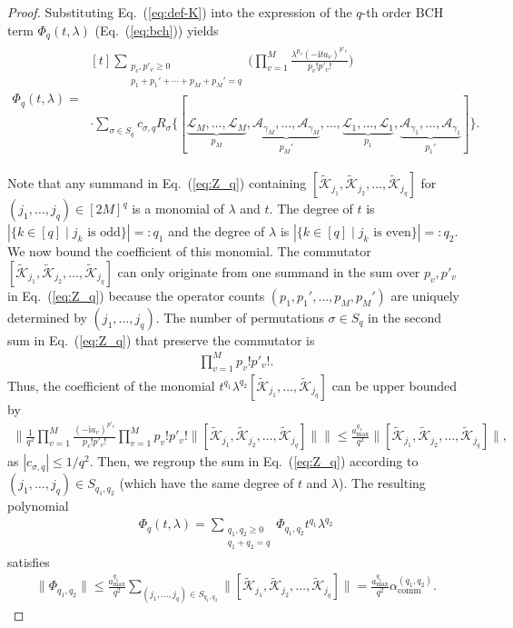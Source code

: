 \documentclass[11pt]{article}
\newcommand{\eq}[1]{(\ref{eq:#1})}
\renewcommand{\i}{\mathrm{i}}
\newcommand{\A}{\mathcal{A}}
\renewcommand{\comm}{\mathrm{comm}}
\newcommand{\mc}{\mathcal}
\begin{document}
\begin{proof}
 	Substituting Eq.~\eq{def-K} into the expression of the $q$-th order BCH term $\Phi_q(t,\lambda)$ (Eq.~\eq{bch}) yields 
 	\begin{align}
 	 	\Phi_q(t,\lambda)
 	 	=~ \begin{multlined}[t]
 	 	 	\sum_{\substack{p_v,p'_v\ge 0\\ p_1+p_1'+\cdots+p_M+p_M'=q }}\bigg(\prod_{v=1}^M \frac{\lambda^{p_v}(-\i ta_v)^{p'_v}}{p_v!p'_v!} \bigg) \\ 
 	 	\cdot \sum_{\sigma\in S_q} c_{\sigma, q}R_{\sigma}\big\{[\underbrace{\mc L_M, \ldots,\mc L_M}_{p_M}, \underbrace{\A_{\gamma_M}, \ldots, \mc A_{\gamma_M}}_{p_M'}, \ldots, \underbrace{ \mc L_1,  \ldots, \mc L_1}_{p_1}, \underbrace{\A_{\gamma_1},  \ldots, \mc A_{\gamma_1}}_{p_1'}]\big\}.\label{eq:Z_q}\end{multlined}
 	\end{align}
 	
 	Note that any summand in Eq.~\eq{Z_q} containing $[\tilde{\mc K}_{j_1}, \tilde{\mc K}_{j_2}, \ldots, \tilde{\mc K}_{j_q}]$ for $(j_1, \ldots, j_q)\in [2M]^q$ is a monomial of $\lambda$ and $t$. The degree of $t$ is $|\{k\in [q]\mid j_k \text{ is odd}\}|=: q_1$ and the degree of $\lambda$ is $|\{k\in [q]\mid j_k \text{ is even}\}|=: q_2$. We now bound the coefficient of this monomial. The commutator $[\tilde{\mc K}_{j_1}, \tilde{\mc K}_{j_2}, \ldots, \tilde{\mc K}_{j_q}]$ can only originate from one summand in the sum over $p_v, p'_v$ in Eq.~\eq{Z_q} because the operator counts $(p_1, p_1', \ldots, p_M, p_M')$ are uniquely determined by $(j_1, \ldots, j_q)$. The number of permutations $\sigma\in S_q$ in the second sum in Eq.~\eq{Z_q} that preserve the commutator is
 	\begin{align*}
 	 	\prod_{v=1}^M p_v!p'_v!.
 	\end{align*}
 	Thus, the coefficient of the monomial $t^{q_1}\lambda^{q_2}[\tilde{\mc K}_{j_1}, \ldots, \tilde{\mc K}_{j_q}]$ can be upper bounded by
 	\begin{align*}
 	 	\bigg\|\frac{1}{q^2}\prod_{v=1}^M \frac{(-\i a_v)^{p'_v}}{p_v!p'_v!}\prod_{v=1}^M p_v!p'_v!\big\|[\tilde{\mc K}_{j_1}, \tilde{\mc K}_{j_2}, \ldots, \tilde{\mc K}_{j_q}]\big\|\bigg\| \le \frac{a_{\max}^{q_1}}{q^2}  \big\|[\tilde{\mc K}_{j_1}, \tilde{\mc K}_{j_2}, \ldots, \tilde{\mc K}_{j_q}]\big\|,
 	\end{align*}
 	as $|c_{\sigma, q}|\le 1/q^2$. Then, we regroup the sum in Eq.~\eq{Z_q} according to $(j_1, \ldots, j_q)\in S_{q_1, q_2}$ (which have the same degree of $t$ and $\lambda$). The resulting polynomial
 	\begin{align*}
 	 	\Phi_q(t,\lambda) = \sum_{\substack{q_1, q_2 \ge 0\\q_1+q_2 = q}}\Phi_{q_1, q_2} t^{q_1}\lambda^{q_2}
 	\end{align*}
 	satisfies
 	\begin{align*}
 	 	\|\Phi_{q_1, q_2}\|\le  \frac{a_{\max}^{q_1}}{q^2}\sum_{(j_1, \ldots, j_q)\in S_{q_1, q_2}} \big\|[\tilde{\mc K}_{j_1}, \tilde{\mc K}_{j_2}, \ldots, \tilde{\mc K}_{j_q}]\big\| = \frac{a_{\max}^{q_1}}{q^2}\alpha_{\comm}^{(q_1, q_2)}.
 	\end{align*}
\end{proof}
\end{document}
